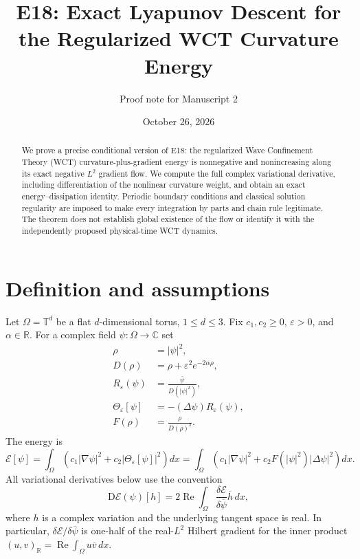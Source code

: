 \documentclass[11pt]{article}
\title{E18: Exact Lyapunov Descent for the Regularized WCT Curvature Energy}
\author{Proof note for Manuscript 2}
\date{October 26, 2026}
\newcommand{\Om}{\Omega}
\newcommand{\EE}{\mathcal E}
\newcommand{\RR}{\mathbb R}
\newcommand{\CC}{\mathbb C}
\newcommand{\DD}{\mathrm D}
\newcommand{\Rea}{\operatorname{Re}}
\newcommand{\Th}{\Theta_\varepsilon}
\begin{document}
\maketitle

\begin{abstract}
We prove a precise conditional version of E18: the regularized Wave
Confinement Theory (WCT) curvature-plus-gradient energy is nonnegative and
nonincreasing along its exact negative $L^2$ gradient flow.  We compute the
full complex variational derivative, including differentiation of the
nonlinear curvature weight, and obtain an exact energy--dissipation
identity.  Periodic boundary conditions and classical solution regularity
are imposed to make every integration by parts and chain rule legitimate.
The theorem does not establish global existence of the flow or identify it
with the independently proposed physical-time WCT dynamics.
\end{abstract}

\section{Definition and assumptions}
Let $\Om=\mathbb T^d$ be a flat $d$-dimensional torus, $1\le d\le3$.
Fix $c_1,c_2\ge0$, $\varepsilon>0$, and $\alpha\in\RR$.  For a complex
field $\psi:\Om\to\CC$ set
\begin{align}
 \rho&=|\psi|^2,\\
 D(\rho)&=\rho+\varepsilon^2e^{-2\alpha\rho},\\
 R_\varepsilon(\psi)&=\frac{\overline\psi}{D(|\psi|^2)},\\
 \Th[\psi]&=-(\Delta\psi)R_\varepsilon(\psi),\\
 F(\rho)&=\frac{\rho}{D(\rho)^2}.
\end{align}
The energy is
\begin{equation}\label{eq:energy}
\boxed{\displaystyle
 \EE[\psi]=\int_\Om\left(c_1|\nabla\psi|^2
                +c_2|\Th[\psi]|^2\right)dx
 =\int_\Om\left(c_1|\nabla\psi|^2
                +c_2F(|\psi|^2)|\Delta\psi|^2\right)dx .}
\end{equation}
All variational derivatives below use the convention
\begin{equation}\label{eq:convention}
 \DD\EE(\psi)[h]
 =2\Rea\int_\Om \frac{\delta\EE}{\delta\overline\psi}
                         \overline h\,dx,
\end{equation}
where $h$ is a complex variation and the underlying tangent space is real.
In particular, $\delta\EE/\delta\overline\psi$ is one-half of the
real-$L^2$ Hilbert gradient for the inner product
$(u,v)_\RR=\Rea\int_\Om u\overline v\,dx$.
\end{document}
